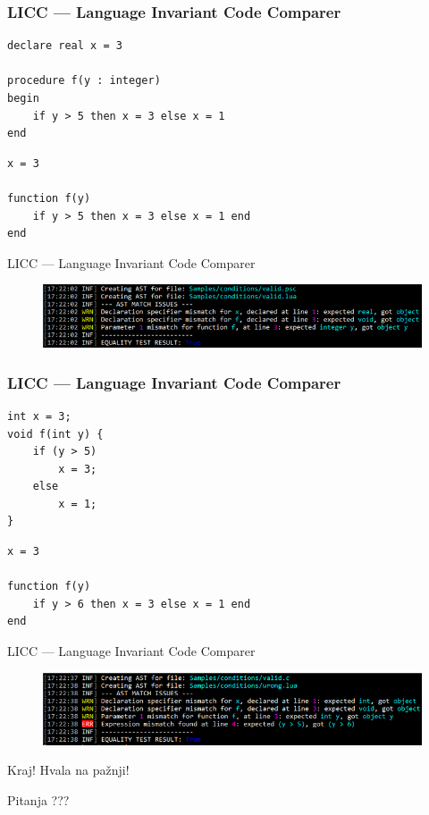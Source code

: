 \documentclass{beamer}
\begin{document}
\begin{frame}[fragile]
    \frametitle{LICC --- Language Invariant Code Comparer}
\begin{lstlisting}
declare real x = 3

procedure f(y : integer)
begin
    if y > 5 then x = 3 else x = 1
end
\end{lstlisting}
\begin{lstlisting}
x = 3

function f(y)
    if y > 5 then x = 3 else x = 1 end
end
\end{lstlisting}
\end{frame}

\begin{frame}{LICC --- Language Invariant Code Comparer}
    \begin{figure}[h!]
        \centering
        \includegraphics[scale=0.55]{images/eval/cond_valid_valid.PNG}
    \end{figure}
\end{frame}

\begin{frame}[fragile]
    \frametitle{LICC --- Language Invariant Code Comparer}
\begin{lstlisting}
int x = 3;
void f(int y) {
    if (y > 5)
        x = 3;
    else
        x = 1;
}
\end{lstlisting}
\begin{lstlisting}
x = 3

function f(y)
    if y > 6 then x = 3 else x = 1 end
end
\end{lstlisting}
\end{frame}

\begin{frame}{LICC --- Language Invariant Code Comparer}
    \begin{figure}[h!]
        \centering
        \includegraphics[scale=0.58]{images/eval/cond_valid_wrong.PNG}
    \end{figure}
\end{frame}


\begin{frame}{Kraj!}
    \centering
    Hvala na pa\v{z}nji!
\end{frame}

\begin{frame}{Pitanja}
    \centering
    ???
\end{frame}
\end{document}
